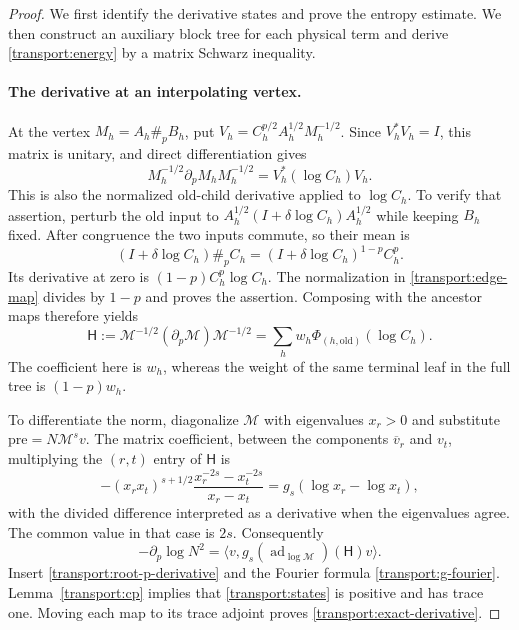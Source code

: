 \begin{proof}
We first identify the derivative states and prove the entropy estimate.
We then construct an auxiliary block tree for each physical term and
derive \eqref{transport:energy} by a matrix Schwarz inequality.

\paragraph{The derivative at an interpolating vertex.}
At the vertex $M_h=A_h\#_pB_h$, put
$V_h=C_h^{p/2}A_h^{1/2}M_h^{-1/2}$.  Since $V_h^*V_h=I$, this matrix
is unitary, and direct differentiation gives
\begin{equation}\label{transport:node-p-derivative}
 M_h^{-1/2}\partial_pM_hM_h^{-1/2}=V_h^*(\log C_h)V_h.
\end{equation}
This is also the normalized old-child derivative applied to $\log C_h$.
To verify that assertion, perturb the old input to
$A_h^{1/2}(I+\delta\log C_h)A_h^{1/2}$ while keeping $B_h$ fixed.
After congruence the two inputs commute, so their mean is
\[
 (I+\delta\log C_h)\#_pC_h
 =(I+\delta\log C_h)^{1-p}C_h^p.
\]
Its derivative at zero is $(1-p)C_h^p\log C_h$.  The normalization in
\eqref{transport:edge-map} divides by $1-p$ and proves the assertion.
Composing with the ancestor maps therefore yields
\begin{equation}\label{transport:root-p-derivative}
 \mathsf H:=\mathcal M^{-1/2}(\partial_p\mathcal M)\mathcal M^{-1/2}
 =\sum_h w_h\Phi_{(h,\mathrm{old})}(\log C_h).
\end{equation}
The coefficient here is $w_h$, whereas the weight of the same terminal
leaf in the full tree is $(1-p)w_h$.

To differentiate the norm, diagonalize $\mathcal M$ with eigenvalues
$x_r>0$ and substitute $\mathrm{pre}=N\mathcal M^s v$.
The matrix coefficient, between the components $\overline v_r$ and
$v_t$, multiplying the $(r,t)$ entry of $\mathsf H$ is
\[
 -(x_rx_t)^{s+1/2}
       \frac{x_r^{-2s}-x_t^{-2s}}{x_r-x_t}
 =g_s(\log x_r-\log x_t),
\]
with the divided difference interpreted as a derivative when the
eigenvalues agree.  The common value in that case is $2s$.
Consequently
\begin{equation}\label{transport:norm-derivative}
 -\partial_p\log N^2
 =\langle v,g_s(\operatorname{ad}_{\log\mathcal M})(\mathsf H)v\rangle.
\end{equation}
Insert \eqref{transport:root-p-derivative} and the Fourier formula
\eqref{transport:g-fourier}.  Lemma~\ref{transport:cp} implies that
\eqref{transport:states} is positive and has trace one.  Moving each
map to its trace adjoint proves \eqref{transport:exact-derivative}.


\end{proof}
